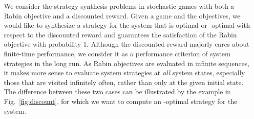 \documentclass[runningheads,a4paper]{llncs}
\begin{document}
We consider the strategy synthesis problems in stochastic games with both a Rabin objective and a discounted reward. Given a game and the objectives, we would like to synthesize a strategy for the system that is optimal or -optimal with respect to the discounted reward and guarantees the satisfaction of the Rabin objective with probability 1. Although the discounted reward majorly cares about finite-time performance, we consider it as a performance criterion of system strategies in the long run. As Rabin objectives are evaluated in infinite sequences, it makes more sense to evaluate system strategies at \emph{all} system states, especially those that are visited infinitely often, rather than only at the given initial state. The difference between these two cases can be illustrated by the example in Fig.~\ref{fig:discount}, for which we want to compute an -optimal strategy for the system. 
\iffalse
\begin{wrapfigure}{r}{6cm}\centering
\begin{tikzpicture}[->,>=stealth',shorten >=1pt,auto,node distance=2.8cm,
                    semithick]
  \tikzstyle{every state}=[draw=black,text=black]

  \node[initial,state,rectangle] (q0)                  {};
  \node[state]         			(q1) [right of=q0]    {};

  \path (q0)    edge [loop above]   node                {} (q0)
                edge [bend left]    node[shift={(0,0)}] {} (q1)
        (q1)    edge [loop above]   node[shift={(0,0)}] {} (q1)
        		    edge [bend left]    node[shift={(0,0)}] {} (q0);
\end{tikzpicture}
\caption{A stochastic game with Rabin pairs .  is an environment state and  is a system state. When the environment takes  at , the state transits to  with probability 0.001 and does a self loop with probability 0.999. The reward is 0 in both cases. If the system takes  at , it does a self loop with probability 1 and the reward is 1; if it takes  at , the state transits back to  with probability 1 and reward 0. }
\end{wrapfigure}
\fi
\end{document}
